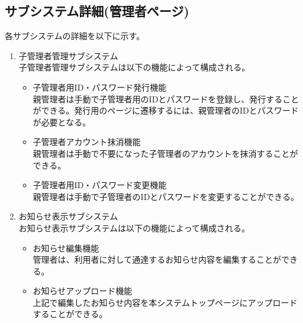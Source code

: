\documentclass[a4j]{jarticle}
\begin{document}
\subsection{サブシステム詳細(管理者ページ)}
各サブシステムの詳細を以下に示す。
\begin{enumerate}

  \item 子管理者管理サブシステム\\
  子管理者管理サブシステムは以下の機能によって構成される。
  \begin{itemize}
    \item 子管理者用ID・パスワード発行機能\\
    親管理者は手動で子管理者用のIDとパスワードを登録し、発行することができる。発行用のページに遷移するには、親管理者のIDとパスワードが必要となる。
    \item 子管理者アカウント抹消機能\\
    親管理者は手動で不要になった子管理者のアカウントを抹消することができる。
    \item 子管理者用ID・パスワード変更機能\\
    親管理者は手動で子管理者のIDとパスワードを変更することができる。\\
  \end{itemize}


  \item お知らせ表示サブシステム\\
  お知らせ表示サブシステムは以下の機能によって構成される。
  \begin{itemize}
    \item お知らせ編集機能\\
    管理者は、利用者に対して通達するお知らせ内容を編集することができる。
    \item お知らせアップロード機能\\
    上記で編集したお知らせ内容を本システムトップページにアップロードすることができる。\\
  \end{itemize}



\end{enumerate}
\end{document}
